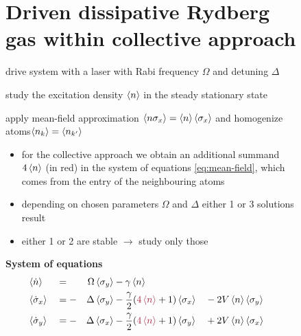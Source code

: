 \documentclass[a0,plainsections]{sciposter}
\begin{document}
\begin{multicols}{2}
	\addtocounter{figure}{-1}
	\begin{figure}
		\begin{minipage}{\textwidth}
			\section{Driven dissipative Rydberg gas within collective approach}
			\begin{AutoMultiColItemize}
				\item drive system with a laser with Rabi frequency $\Omega$ and detuning $\Delta$
				\item study the excitation density $\expval{n}$ in the steady stationary state
				\item apply mean-field approximation $\expval{n \sigma_x}=\expval{n}\expval{\sigma_x}$ and homogenize atoms$\expval{n_k}=\expval{n_{k'}}$ \cite{PhysRevLett.101.250601}
			\end{AutoMultiColItemize}
			\begin{itemize}
				\renewcommand\labelitemi{\textcolor{rot}{$\rightarrow$}}
				\item \textcolor{rot}{for the collective approach we obtain an additional summand $4\expval{n}$ (in red)} in the system of equations \eqref{eq:mean-field}, which comes from the entry of the neighbouring atoms
				\item depending on chosen parameters $\Omega$ and $\Delta$ either 1 or 3 solutions result
				\item either 1 or 2 are stable $\rightarrow$ study only those
			\end{itemize}
			\begin{minipage}[c][][t]{0.54\textwidth}
				\begin{shaded}
					\textbf{System of equations}
					\begin{alignat}{7}%
						 & \expval{\dot{n}}        &  & =  & \Omega \expval{\sigma_y} & - \gamma \expval{n}                                                           &  &                                   &  & \nonumber             \\
						 & \expval{\dot{\sigma}_x} &  & =- & \Delta \expval{\sigma_y} & -\frac{\gamma}{2}(\mathbin{\textcolor{rot}{4\expval{n}}}+1) \expval{\sigma_x} &  & -2 V \expval{n} \expval{\sigma_y} &  & \label{eq:mean-field} \\
						 & \expval{\dot{\sigma}_y} &  & =- & \Delta \expval{\sigma_x} & -\frac{\gamma}{2}(\mathbin{\textcolor{rot}{4\expval{n}}}+1)\expval{\sigma_y}  &  & +2 V \expval{n} \expval{\sigma_x} &  & \nonumber             \\ %

\end{alignat}
\end{shaded}
\end{minipage}
\end{minipage}
\end{figure}
\end{multicols}
\end{document}
